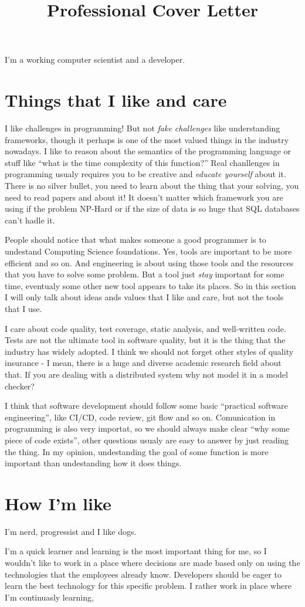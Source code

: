 \documentclass[11pt,a4paper,sans]{moderncv}
\title{Professional Cover Letter}
\begin{document}
\makecvtitle %
I'm a working computer scientist and a developer.

\section{Things that I like and care}
I like challenges in programming! But not \textit{fake challenges}
like understanding frameworks, though it perhaps is one of the most
valued things in the industry nowadays.  I like to reason about the
semantics of the programming language or stuff like ``what is the time
complexity of this function?''  Real chanllenges in programming usualy
requires you to be creative and \textit{educate yourself} about it.
There is no silver bullet, you need to learn about the thing that your
solving, you need to read papers and about it! It doesn't matter which
framework you are using if the problem NP-Hard or if the size of data
is so huge that SQL databases can't hadle it.

People should notice that what makes someone a good programmer is to
undestand Computing Science foundations.  Yes, tools are important
to be more efficient and so on.
And engineering is about using those tools and the
resources that you have to solve some problem.  But a tool just
\textit{stay} important for some time, eventualy some other new tool
appears to take its places.  So in this section I will only talk about ideas
ands values that I like and care, but not the tools that I use.

I care about code quality, test coverage, static analysis, and
well-written code. Tests are not the ultimate tool in software
quality, but it is the thing that the industry has widely adopted. I
think we should not forget other styles of quality insurance - I mean,
there is a huge and diverse academic research field about that.  If
you are dealing with a distributed system why not model it in a model
checker?

I think that software development should follow some basic ``practical
software engineering'', like CI/CD, code review, git flow and so on.
Comunication in programming is also very importat, so we should always
make clear ``why some piece of code exists'', other questions usualy
are easy to answer by just reading the thing. In my opinion, undestanding
the goal of some function is more important than undestanding how it
does things.

\section{How I'm like}
I'm nerd, progressist and I like dogs.

I'm a quick learner and learning is the most important thing for me,
so I wouldn't like to work in a place where decisions are made based
only on using the technologies that the employees already
know. Developers should be eager to learn the best technology for this
specific problem. I rather work in place where I'm continuasly learning,
\end{document}
